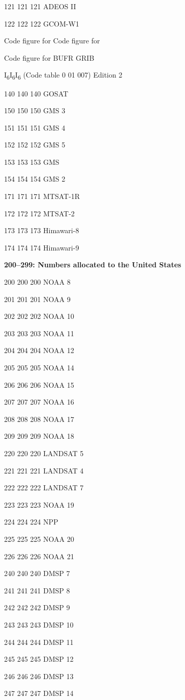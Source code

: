 121 121 121 ADEOS II

122 122 122 GCOM-W1

Code figure for Code figure for

Code figure for BUFR GRIB

I\textsubscript{6}I\textsubscript{6}I\textsubscript{6} (Code table 0 01 007) Edition 2

140 140 140 GOSAT

150 150 150 GMS 3

151 151 151 GMS 4

152 152 152 GMS 5

153 153 153 GMS

154 154 154 GMS 2

171 171 171 MTSAT-1R

172 172 172 MTSAT-2

173 173 173 Himawari-8

174 174 174 Himawari-9

\textbf{200--299: Numbers allocated to the United States}

200 200 200 NOAA 8

201 201 201 NOAA 9

202 202 202 NOAA 10

203 203 203 NOAA 11

204 204 204 NOAA 12

205 205 205 NOAA 14

206 206 206 NOAA 15

207 207 207 NOAA 16

208 208 208 NOAA 17

209 209 209 NOAA 18

220 220 220 LANDSAT 5

221 221 221 LANDSAT 4

222 222 222 LANDSAT 7

223 223 223 NOAA 19

224 224 224 NPP

225 225 225 NOAA 20

226 226 226 NOAA 21

240 240 240 DMSP 7

241 241 241 DMSP 8

242 242 242 DMSP 9

243 243 243 DMSP 10

244 244 244 DMSP 11

245 245 245 DMSP 12

246 246 246 DMSP 13

247 247 247 DMSP 14

